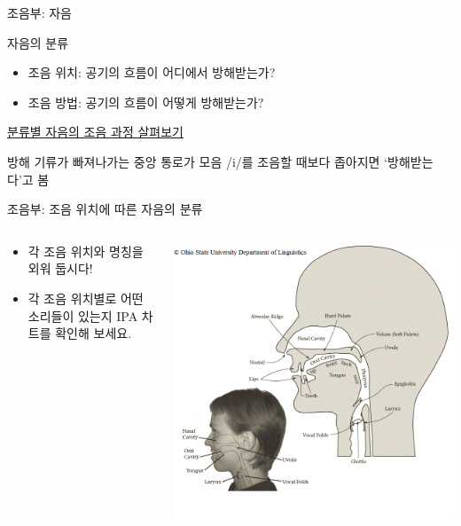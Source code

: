 \documentclass[11pt, aspectratio=169]{beamer}
\begin{document}
\begin{frame}[t]{조음부: 자음}
    \begin{block}{자음의 분류}
        \begin{itemize}
            \item 조음 위치: 공기의 흐름이 어디에서 방해받는가? 
            \item 조음 방법: 공기의 흐름이 어떻게 방해받는가?
        \end{itemize}
    \end{block}
     \href{https://seeingspeech.ac.uk}{\underline{분류별 자음의 조음 과정 살펴보기}}
    \begin{block}{방해}
        기류가 빠져나가는 중앙 통로가 모음 /i/를 조음할 때보다 좁아지면 ‘방해받는다’고 봄
    \end{block}
\end{frame}

\begin{frame}[t]{조음부: 조음 위치에 따른 자음의 분류}
    \begin{columns}
        \begin{column}[T]{0.33\textwidth}
            \begin{itemize}
                \item 각 조음 위치와 명칭을 외워 둡시다!
                \item 각 조음 위치별로 어떤 소리들이 있는지 IPA 차트를 확인해 보세요.
            \end{itemize}
        \end{column}
        \begin{column}[T]{0.6\textwidth}
            \centering
            \includegraphics[height=1.0\textheight]{img/Saggital.png}            
        \end{column}
    \end{columns}
\end{frame}
\end{document}

